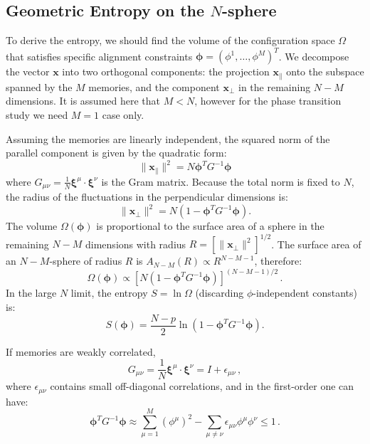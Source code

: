 \documentclass{article}
\theoremstyle{plain}
\theoremstyle{definition}
\theoremstyle{remark}
\begin{document}
\subsection{Geometric Entropy on the $N$-sphere}

To derive the entropy, we should find the volume of the configuration space $\Omega$ that satisfies specific alignment constraints $\bm{\phi} = (\phi^1, \dots, \phi^M)^T$. We decompose the vector $\bm{x}$ into two orthogonal components: the projection $\bm{x}_{\parallel}$ onto the subspace spanned by the $M$ memories, and the component $\bm{x}_{\perp}$ in the remaining $N-M$ dimensions. It is assumed here that $M<N$, however for the phase transition study we need $M=1$ case only.

Assuming the memories are linearly independent, the squared norm of the parallel component is given by the quadratic form:
\begin{equation}
    \|\mathbf{x}_{\parallel}\|^2 = N \bm{\phi}^T G^{-1} \bm{\phi}
\end{equation}
where $G_{\mu\nu} = \frac{1}{N} \bm{\xi}^\mu \cdot \bm{\xi}^\nu$ is the Gram matrix. Because the total norm is fixed to $N$, the radius of the fluctuations in the perpendicular dimensions is:
\begin{equation}
    \|\mathbf{x}_{\perp}\|^2 = N \left( 1 - \bm{\phi}^T G^{-1} \bm{\phi} \right).
\end{equation}
The volume $\Omega(\bm{\phi})$ is proportional to the surface area of a sphere in the remaining $N-M$ dimensions with radius $R = [\|\mathbf{x}_{\perp}\|^2]^{1/2}$. The surface area of an $N-M$-sphere of radius $R$ is $A_{N-M}(R) \propto R^{N-M-1}$, therefore:
\begin{equation}
    \Omega(\bm{\phi}) \propto \left[ N \left( 1 - \bm{\phi}^T G^{-1} \bm{\phi} \right) \right]^{(N-M-1)/2}\,.
\end{equation}
In the large $N$ limit, the entropy $S = \ln \Omega$ (discarding $\phi$-independent constants) is:
\begin{equation}
    S(\bm{\phi}) = \frac{N-p}{2} \ln \left( 1 - \bm{\phi}^T G^{-1} \bm{\phi} \right).
\end{equation}

If memories are weakly correlated,  
\begin{equation}
    G_{\mu\nu} = \frac{1}{N} \bm{\xi}^\mu \cdot \bm{\xi}^\nu = I + \epsilon_{\mu\nu}\,,
\end{equation}
where $\epsilon_{\mu\nu}$ contains small off-diagonal correlations, and
in the first-order one can have:
\begin{equation}
    \bm{\phi}^T G^{-1} \bm{\phi} \approx \sum_{\mu=1}^{M} (\phi^\mu)^2 - \sum_{\mu \neq \nu} \epsilon_{\mu\nu} \phi^\mu \phi^\nu \le 1\,.
    \label{eq:gram1}
\end{equation}
\end{document}
